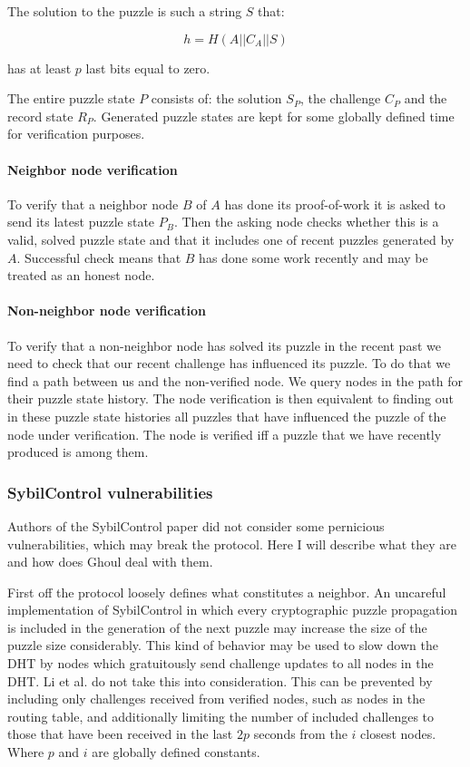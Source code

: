   The solution to the puzzle is such a string $S$ that:

  \[ h = H\left(A||C_A||S\right)\]

  has at least $p$ last bits equal to zero.

  The entire puzzle state $P$ consists of: the solution $S_P$, the challenge
  $C_P$ and the record state $R_P$. Generated puzzle states are kept for some
  globally defined time for verification purposes.

  \paragraph{Neighbor node verification}
  To verify that a neighbor node $B$ of $A$ has done its proof-of-work it is
  asked to send its latest puzzle state $P_B$. Then the asking node checks
  whether this is a valid, solved puzzle state and that it includes one of
  recent puzzles generated by $A$. Successful check means that $B$ has done some
  work recently and may be treated as an honest node.

  \paragraph{Non-neighbor node verification}
  To verify that a non-neighbor node has solved its puzzle in the recent past we
  need to check that our recent challenge has influenced its puzzle. To do that
  we find a path between us and the non-verified node. We query nodes in the
  path for their puzzle state history. The node verification is then equivalent
  to finding out in these puzzle state histories all puzzles that have
  influenced the puzzle of the node under verification. The node is verified iff
  a puzzle that we have recently produced is among them.

\subsubsection{SybilControl vulnerabilities}
  Authors of the SybilControl paper did not consider some pernicious
  vulnerabilities, which may break the protocol. Here I will describe what they
  are and how does Ghoul deal with them.

  First off the protocol loosely defines what constitutes a neighbor. An
  uncareful implementation of SybilControl in which every cryptographic puzzle
  propagation is included in the generation of the next puzzle may increase the
  size of the puzzle size considerably. This kind of behavior may be used to
  slow down the DHT by nodes which gratuitously send challenge updates to all
  nodes in the DHT. Li et al. do not take this into consideration. This can
  be prevented by including only challenges received from verified nodes, such
  as nodes in the routing table, and additionally limiting the number of
  included challenges to those that have been received in the last $2p$ seconds
  from the $i$ closest nodes. Where $p$ and $i$ are globally defined constants.

